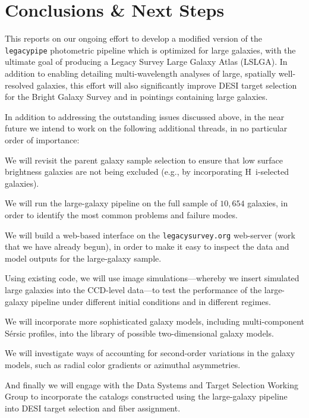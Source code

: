 \section{Conclusions \& Next Steps}\label{sec:summary}

This \tnote{} reports on our ongoing effort to develop a modified version of the
{\tt legacypipe} photometric pipeline which is optimized for large galaxies,
with the ultimate goal of producing a Legacy Survey Large Galaxy Atlas (LSLGA).
In addition to enabling detailing multi-wavelength analyses of large, spatially
well-resolved galaxies, this effort will also significantly improve DESI target
selection for the Bright Galaxy Survey and in pointings containing large
galaxies.

In addition to addressing the outstanding issues discussed above, in the near
future we intend to work on the following additional threads, in no particular
order of importance:
\begin{itemize*}
\item{We will revisit the parent galaxy sample selection to ensure that low
  surface brightness galaxies are not being excluded (e.g., by incorporating
  H~{\sc i}-selected galaxies).}
\item{We will run the large-galaxy pipeline on the full sample of $10,654$
  galaxies, in order to identify the most common problems and failure modes.}
\item{We will build a web-based interface on the {\tt legacysurvey.org}
  web-server (work that we have already begun), in order to make it easy to
  inspect the data and model outputs for the large-galaxy sample.}
\item{Using existing code, we will use image simulations---whereby we insert
  simulated large galaxies into the CCD-level data---to test the performance of
  the large-galaxy pipeline under different initial conditions and in different
  regimes.}
\item{We will incorporate more sophisticated galaxy models, including
  multi-component S\'{e}rsic profiles, into the library of possible
  two-dimensional galaxy models.}
\item{We will investigate ways of accounting for second-order variations in the
  galaxy models, such as radial color gradients or azimuthal asymmetries.}
\item{And finally we will engage with the Data Systems and Target Selection
  Working Group to incorporate the catalogs constructed using the large-galaxy
  pipeline into DESI target selection and fiber assignment.}
\end{itemize*}


